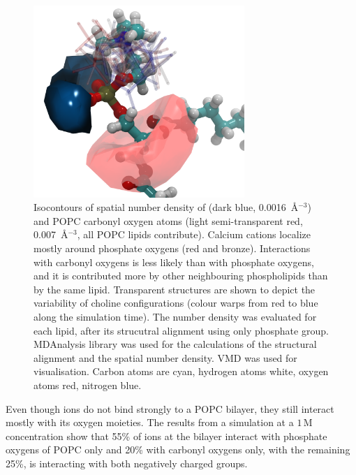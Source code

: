 \documentclass[journal=jpcbfk,manuscript=article]{achemso}
\begin{document}
\begin{figure}[tb!]
  \centering
  \includegraphics[width=8.0cm]{../Fig/isocontours_r37_ca_O-carb.png} %
  \caption{\label{fig:volmaps}
    Isocontours of spatial number density of  (dark blue, 0.0016~\AA$^{-3}$) 
    and POPC carbonyl oxygen atoms (light semi-transparent red, 0.007~\AA$^{-3}$, all POPC lipids contribute). 
    Calcium cations localize mostly around phosphate oxygens (red and bronze).
    Interactions with carbonyl oxygens is less likely than with phosphate oxygens, 
    and it is contributed more by other neighbouring phospholipids than by the same lipid. 
    Transparent structures are shown to depict the variability of choline configurations 
    (colour warps from red to blue along the simulation time). 
    The number density was evaluated for each lipid, 
    after its strucutral alignment using only phosphate group.
    MDAnalysis \cite{mdanalysis2011} library was used for 
    the calculations of the structural alignment and the spatial number density. 
    VMD \cite{hump96} was used for visualisation. 
    Carbon atoms are cyan, hydrogen atoms white, oxygen atoms red, nitrogen blue.
  }
\end{figure}

Even though  ions do not bind strongly to a POPC bilayer, they still interact mostly with its oxygen moieties. The results from a simulation at a $1\,$M  concentration show that 55\% of  ions at the bilayer interact with phosphate oxygens of POPC only and 20\% with carbonyl oxygens only, with the remaining 25\%, is interacting with both negatively charged groups.
\end{document}

